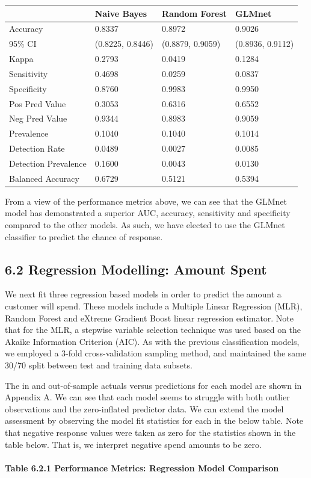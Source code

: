 \documentclass[]{article}
\let\oldparagraph\paragraph
\renewcommand{\paragraph}[1]{\oldparagraph{#1}\mbox{}}
\begin{document}
\begin{longtable}[]{@{}llll@{}}
\toprule
& Naive Bayes & Random Forest & GLMnet\tabularnewline
\midrule
\endhead
Accuracy & 0.8337 & 0.8972 & 0.9026\tabularnewline
95\% CI & (0.8225, 0.8446) & (0.8879, 0.9059) & (0.8936,
0.9112)\tabularnewline
Kappa & 0.2793 & 0.0419 & 0.1284\tabularnewline
Sensitivity & 0.4698 & 0.0259 & 0.0837\tabularnewline
Specificity & 0.8760 & 0.9983 & 0.9950\tabularnewline
Pos Pred Value & 0.3053 & 0.6316 & 0.6552\tabularnewline
Neg Pred Value & 0.9344 & 0.8983 & 0.9059\tabularnewline
Prevalence & 0.1040 & 0.1040 & 0.1014\tabularnewline
Detection Rate & 0.0489 & 0.0027 & 0.0085\tabularnewline
Detection Prevalence & 0.1600 & 0.0043 & 0.0130\tabularnewline
Balanced Accuracy & 0.6729 & 0.5121 & 0.5394\tabularnewline
\bottomrule
\end{longtable}

From a view of the performance metrics above, we can see that the GLMnet
model has demonstrated a superior AUC, accuracy, sensitivity and
specificity compared to the other models. As such, we have elected to
use the GLMnet classifier to predict the chance of response.

\subsection{6.2 Regression Modelling: Amount
Spent}\label{regression-modelling-amount-spent}

We next fit three regression based models in order to predict the amount
a customer will spend. These models include a Multiple Linear Regression
(MLR), Random Forest and eXtreme Gradient Boost linear regression
estimator. Note that for the MLR, a stepwise variable selection
technique was used based on the Akaike Information Criterion (AIC). As
with the previous classification models, we employed a 3-fold
cross-validation sampling method, and maintained the same 30/70 split
between test and training data subsets.

The in and out-of-sample actuals versus predictions for each model are
shown in Appendix A. We can see that each model seems to struggle with
both outlier observations and the zero-inflated predictor data. We can
extend the model assessment by observing the model fit statistics for
each in the below table. Note that negative response values were taken
as zero for the statistics shown in the table below. That is, we
interpret negative spend amounts to be zero.

\paragraph{Table 6.2.1 Performance Metrics: Regression Model
Comparison}\label{table-6.2.1-performance-metrics-regression-model-comparison}
\end{document}
